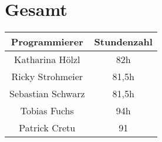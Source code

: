\section{Gesamt}
\begin{center}
	\begin{tabular}{|c|c|}
		\hline \textbf{Programmierer} & \textbf{Stundenzahl} \\ 
		\hline Katharina Hölzl  &  82h\\ 
		\hline Ricky Strohmeier & 81,5h \\ 
		\hline Sebastian Schwarz & 81,5h \\ 
		\hline Tobias Fuchs &  94h\\ 
		\hline Patrick Cretu &  91\\ 
		\hline 
	\end{tabular}
\end{center} 